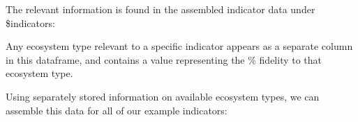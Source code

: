 \documentclass[
]{book}
\newenvironment{Shaded}{\begin{snugshade}}{\end{snugshade}}
\newcommand{\CommentTok}[1]{\textcolor[rgb]{0.56,0.35,0.01}{\textit{#1}}}
\newcommand{\FunctionTok}[1]{\textcolor[rgb]{0.00,0.00,0.00}{#1}}
\newcommand{\NormalTok}[1]{#1}
\newcommand{\OtherTok}[1]{\textcolor[rgb]{0.56,0.35,0.01}{#1}}
\newcommand{\SpecialCharTok}[1]{\textcolor[rgb]{0.00,0.00,0.00}{#1}}
\newcommand{\StringTok}[1]{\textcolor[rgb]{0.31,0.60,0.02}{#1}}
\begin{document}
The relevant information is found in the assembled indicator data under \$indicators:

\begin{Shaded}
\end{Shaded}

Any ecosystem type relevant to a specific indicator appears as a separate column in this dataframe, and contains a value representing the \% fidelity to that ecosystem type.

Using separately stored information on available ecosystem types, we can assemble this data for all of our example indicators:
\end{document}
